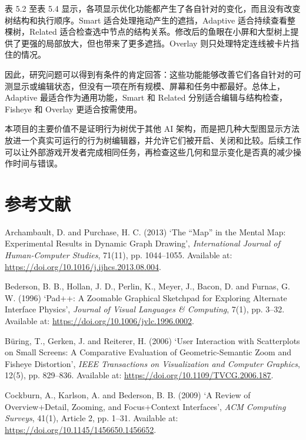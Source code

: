 \documentclass[11pt,a4paper,oneside,extrafontsizes]{memoir}
\begin{document}
表 5.2 至表 5.4 显示，各项显示优化功能都产生了各自针对的变化，而且没有改变树结构和执行顺序。Smart 适合处理拖动产生的遮挡，Adaptive 适合持续查看整棵树，Related 适合检查选中节点的结构关系。修改后的鱼眼在小屏和大型树上提供了更强的局部放大，但也带来了更多遮挡。Overlay 则只处理特定连线被卡片挡住的情况。

因此，研究问题可以得到有条件的肯定回答：这些功能能够改善它们各自针对的可测显示或编辑状态，但没有一项在所有规模、屏幕和任务中都最好。总体上，Adaptive 最适合作为通用功能，Smart 和 Related 分别适合编辑与结构检查，Fisheye 和 Overlay 更适合按需使用。

本项目的主要价值不是证明行为树优于其他 AI 架构，而是把几种大型图显示方法放进一个真实可运行的行为树编辑器，并允许它们被开启、关闭和比较。后续工作可以让外部游戏开发者完成相同任务，再检查这些几何和显示变化是否真的减少操作时间与错误。

\chapter*{参考文献}

Archambault, D. and Purchase, H. C. (2013) ‘The “Map” in the Mental Map: Experimental Results in Dynamic Graph Drawing’, \emph{International Journal of Human-Computer Studies}, 71(11), pp. 1044–1055. Available at: \href{https://doi.org/10.1016/j.ijhcs.2013.08.004}{https://doi.org/10.1016/j.ijhcs.2013.08.004}.

Bederson, B. B., Hollan, J. D., Perlin, K., Meyer, J., Bacon, D. and Furnas, G. W. (1996) ‘Pad++: A Zoomable Graphical Sketchpad for Exploring Alternate Interface Physics’, \emph{Journal of Visual Languages \& Computing}, 7(1), pp. 3–32. Available at: \href{https://doi.org/10.1006/jvlc.1996.0002}{https://doi.org/10.1006/jvlc.1996.0002}.

Büring, T., Gerken, J. and Reiterer, H. (2006) ‘User Interaction with Scatterplots on Small Screens: A Comparative Evaluation of Geometric-Semantic Zoom and Fisheye Distortion’, \emph{IEEE Transactions on Visualization and Computer Graphics}, 12(5), pp. 829–836. Available at: \href{https://doi.org/10.1109/TVCG.2006.187}{https://doi.org/10.1109/TVCG.2006.187}.

Cockburn, A., Karlson, A. and Bederson, B. B. (2009) ‘A Review of Overview+Detail, Zooming, and Focus+Context Interfaces’, \emph{ACM Computing Surveys}, 41(1), Article 2, pp. 1–31. Available at: \href{https://doi.org/10.1145/1456650.1456652}{https://doi.org/10.1145/1456650.1456652}.
\end{document}
